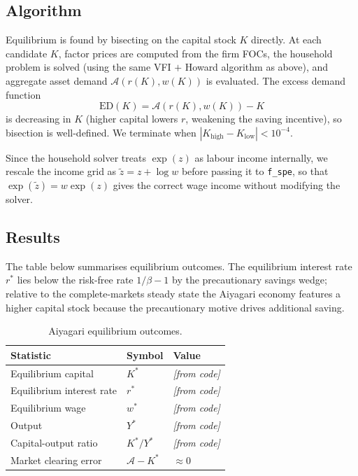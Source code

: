\documentclass{article}
\begin{document}
\subsection{Algorithm}

Equilibrium is found by bisecting on the capital stock $K$ directly. At each
candidate $K$, factor prices are computed from the firm FOCs, the household problem
is solved (using the same VFI $+$ Howard algorithm as above), and aggregate asset
demand $\mathcal{A}(r(K), w(K))$ is evaluated. The excess demand function
\begin{equation*}
    \text{ED}(K) = \mathcal{A}(r(K),w(K)) - K
\end{equation*}
is decreasing in $K$ (higher capital lowers $r$, weakening the saving incentive),
so bisection is well-defined. We terminate when $|K_{\text{high}} - K_{\text{low}}| < 10^{-4}$.

Since the household solver treats $\exp(z)$ as labour income internally, we rescale
the income grid as $\tilde{z} = z + \log w$ before passing it to \texttt{f\_spe},
so that $\exp(\tilde{z}) = w\exp(z)$ gives the correct wage income without
modifying the solver.

\subsection{Results}

The table below summarises equilibrium outcomes. The equilibrium
interest rate $r^*$ lies below the risk-free rate $1/\beta-1$ by the precautionary
savings wedge; relative to the complete-markets steady state the Aiyagari economy
features a higher capital stock because the precautionary motive drives additional saving.

\begin{table}[H]
\centering
\begin{tabular}{lll}
    \toprule
    Statistic & Symbol & Value \\
    \midrule
    Equilibrium capital       & $K^*$              & \textit{[from code]} \\
    Equilibrium interest rate & $r^*$              & \textit{[from code]} \\
    Equilibrium wage          & $w^*$              & \textit{[from code]} \\
    Output                    & $Y^*$              & \textit{[from code]} \\
    Capital-output ratio      & $K^*/Y^*$          & \textit{[from code]} \\
    Market clearing error     & $\mathcal{A} - K^*$& $\approx 0$ \\
    \bottomrule
\end{tabular}
\caption{Aiyagari equilibrium outcomes.}
\label{tab:aiyagari_results}
\end{table}
\end{document}
